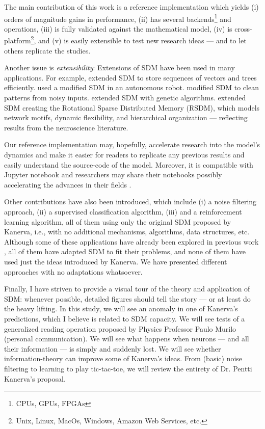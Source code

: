 The main contribution of this work is a reference implementation which yields (i) orders of magnitude gains in performance, (ii) has several backends\footnote{CPUs, GPUs, FPGAs} and operations, (iii) is fully validated against the mathematical model, (iv) is cross-platform\footnote{Unix, Linux, MacOs, Windows, Amazon Web Services, etc.}, and (v) is easily extensible to test new research ideas --- and to let others replicate the studies.

Another issue is \emph{extensibility}: Extensions of SDM have been used in many applications. For example, \citet{Snaider2011} extended SDM to store sequences of vectors and trees efficiently.  \citet{Rajesh1998} used a modified SDM in an autonomous robot. \citet{Meng2009} modified SDM to clean patterns from noisy inputs. \citet{fan1997genetic} extended SDM with genetic algorithms. \citet{chada2016you} extended SDM creating the Rotational Sparse Distributed Memory (RSDM), which models network motifs, dynamic flexibility, and hierarchical organization --- reflecting results from the neuroscience literature.

Our reference implementation may, hopefully, accelerate research into the model's dynamics and make it easier for readers to replicate any previous results and easily understand the source-code of the model.  Moreover, it is compatible with Jupyter notebook and researchers may share their notebooks possibly accelerating the advances in their fields \citep{shen2014interactive}.

Other contributions have also been introduced, which include (i) a noise filtering approach, (ii) a supervised classification algorithm, (iii) and a reinforcement learning algorithm, all of them using only the original SDM proposed by Kanerva, i.e., with no additional mechanisms, algorithms, data structures, etc. Although some of these applications have already been explored in previous work \citep{Meng2009, fan1997genetic, rao1995natural}, all of them have adapted SDM to fit their problems, and none of them have used just the ideas introduced by Kanerva. We have presented different approaches with no adaptations whatsoever.

Finally, I have striven to provide a visual tour of the theory and application of SDM: whenever possible, detailed figures should tell the story --- or at least do the heavy lifting. In this study, we will see an anomaly in one of Kanerva's predictions, which I believe is related to SDM capacity. We will see tests of a generalized reading operation proposed by Physics Professor Paulo Murilo (personal communication).  We will see what happens when neurons --- and all their information --- is simply and suddenly lost.  We will see whether information-theory can improve some of Kanerva's ideas.  From (basic) noise filtering to learning to play tic-tac-toe, we will review the entirety of Dr. Pentti Kanerva's proposal.

